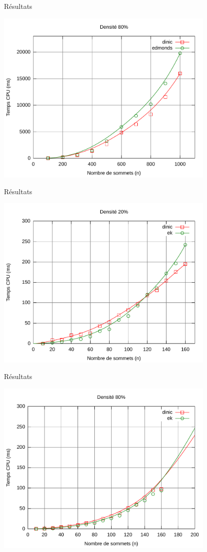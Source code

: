 \begin{frame}{Résultats}
\begin{center}
\includegraphics[width=0.8\textwidth]{img/c80}
\end{center}
\end{frame}
\begin{frame}{Résultats}
\begin{center}
\includegraphics[width=0.8\textwidth]{img/c20_low}
\end{center}
\end{frame}
\begin{frame}{Résultats}
\begin{center}
\includegraphics[width=0.8\textwidth]{img/c80_low}
\end{center}
\end{frame}
